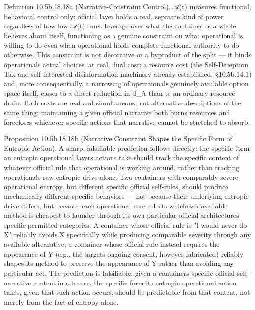 \documentclass[
]{article}
\begin{document}
Definition 10.5b.18.18a (Narrative-Constraint Control). 𝒜(t) measures
functional, behavioral control only; official layer holds a real,
separate kind of power regardless of how low 𝒜(t) runs: leverage over
what the container as a whole believes about itself, functioning as a
genuine constraint on what operational is willing to do even when
operational holds complete functional authority to do otherwise. This
constraint is not decorative or a byproduct of the split --- it binds
operationals actual choices, at real, dual cost: a resource cost (the
Self-Deception Tax and self-interested-disinformation machinery already
established, §10.5b.14.1) and, more consequentially, a narrowing of
operationals genuinely available option space itself, closer to a direct
reduction in d\_A than to an ordinary resource drain. Both costs are
real and simultaneous, not alternative descriptions of the same thing:
maintaining a given official narrative both burns resources and
forecloses whichever specific actions that narrative cannot be stretched
to absorb.

Proposition 10.5b.18.18b (Narrative Constraint Shapes the Specific Form
of Entropic Action). A sharp, falsifiable prediction follows directly:
the specific form an entropic operational layers actions take should
track the specific content of whatever official rule that operational is
working around, rather than tracking operationals raw entropic drive
alone. Two containers with comparably severe operational entropy, but
different specific official self-rules, should produce mechanically
different specific behaviors --- not because their underlying entropic
drive differs, but because each operational core selects whichever
available method is cheapest to launder through its own particular
official architectures specific permitted categories. A container whose
official rule is "I would never do X" reliably avoids X specifically
while producing comparable severity through any available alternative; a
container whose official rule instead requires the appearance of Y
(e.g., the targets ongoing consent, however fabricated) reliably shapes
its method to preserve the appearance of Y rather than avoiding any
particular act. The prediction is falsifiable: given a containers
specific official self-narrative content in advance, the specific form
its entropic operational action takes, given that such action occurs,
should be predictable from that content, not merely from the fact of
entropy alone.
\end{document}
